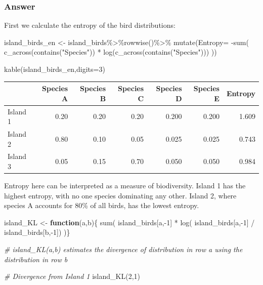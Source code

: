 \documentclass[
]{book}
\newenvironment{Shaded}{\begin{snugshade}}{\end{snugshade}}
\newcommand{\AttributeTok}[1]{\textcolor[rgb]{0.77,0.63,0.00}{#1}}
\newcommand{\CommentTok}[1]{\textcolor[rgb]{0.56,0.35,0.01}{\textit{#1}}}
\newcommand{\ControlFlowTok}[1]{\textcolor[rgb]{0.13,0.29,0.53}{\textbf{#1}}}
\newcommand{\DecValTok}[1]{\textcolor[rgb]{0.00,0.00,0.81}{#1}}
\newcommand{\FunctionTok}[1]{\textcolor[rgb]{0.00,0.00,0.00}{#1}}
\newcommand{\NormalTok}[1]{#1}
\newcommand{\OtherTok}[1]{\textcolor[rgb]{0.56,0.35,0.01}{#1}}
\newcommand{\SpecialCharTok}[1]{\textcolor[rgb]{0.00,0.00,0.00}{#1}}
\newcommand{\StringTok}[1]{\textcolor[rgb]{0.31,0.60,0.02}{#1}}
\begin{document}
\hypertarget{answer-72}{%
\subsubsection*{Answer}\label{answer-72}}

First we calculate the entropy of the bird distributions:

\begin{Shaded}
\begin{Highlighting}[]
\NormalTok{island\_birds\_en }\OtherTok{\textless{}{-}}\NormalTok{ island\_birds}\SpecialCharTok{\%\textgreater{}\%}\FunctionTok{rowwise}\NormalTok{()}\SpecialCharTok{\%\textgreater{}\%}
  \FunctionTok{mutate}\NormalTok{(}\AttributeTok{Entropy=} \SpecialCharTok{{-}}\FunctionTok{sum}\NormalTok{( }\FunctionTok{c\_across}\NormalTok{(}\FunctionTok{contains}\NormalTok{(}\StringTok{"Species"}\NormalTok{)) }\SpecialCharTok{*} \FunctionTok{log}\NormalTok{(}\FunctionTok{c\_across}\NormalTok{(}\FunctionTok{contains}\NormalTok{(}\StringTok{"Species"}\NormalTok{))) ))}
  
\FunctionTok{kable}\NormalTok{(island\_birds\_en,}\AttributeTok{digits=}\DecValTok{3}\NormalTok{)}
\end{Highlighting}
\end{Shaded}

\begin{tabular}{l|r|r|r|r|r|r}
\hline
  & Species A & Species B & Species C & Species D & Species E & Entropy\\
\hline
Island 1 & 0.20 & 0.20 & 0.20 & 0.200 & 0.200 & 1.609\\
\hline
Island 2 & 0.80 & 0.10 & 0.05 & 0.025 & 0.025 & 0.743\\
\hline
Island 3 & 0.05 & 0.15 & 0.70 & 0.050 & 0.050 & 0.984\\
\hline
\end{tabular}

Entropy here can be interpreted as a measure of biodiversity. Island 1 has the highest entropy, with no one species dominating any other. Island 2, where species A accounts for 80\% of all birds, has the lowest entropy.

\begin{Shaded}
\begin{Highlighting}[]
\NormalTok{island\_KL }\OtherTok{\textless{}{-}} \ControlFlowTok{function}\NormalTok{(a,b)\{ }\FunctionTok{sum}\NormalTok{( island\_birds[a,}\SpecialCharTok{{-}}\DecValTok{1}\NormalTok{] }\SpecialCharTok{*} \FunctionTok{log}\NormalTok{( island\_birds[a,}\SpecialCharTok{{-}}\DecValTok{1}\NormalTok{] }\SpecialCharTok{/}\NormalTok{ island\_birds[b,}\SpecialCharTok{{-}}\DecValTok{1}\NormalTok{]) )\}}

\CommentTok{\# island\_KL(a,b) estimates the divergence of distribution in row a using the distribution in row b  }

\CommentTok{\# Divergence from Island 1}
\FunctionTok{island\_KL}\NormalTok{(}\DecValTok{2}\NormalTok{,}\DecValTok{1}\NormalTok{)}
\end{Highlighting}
\end{Shaded}
\end{document}
